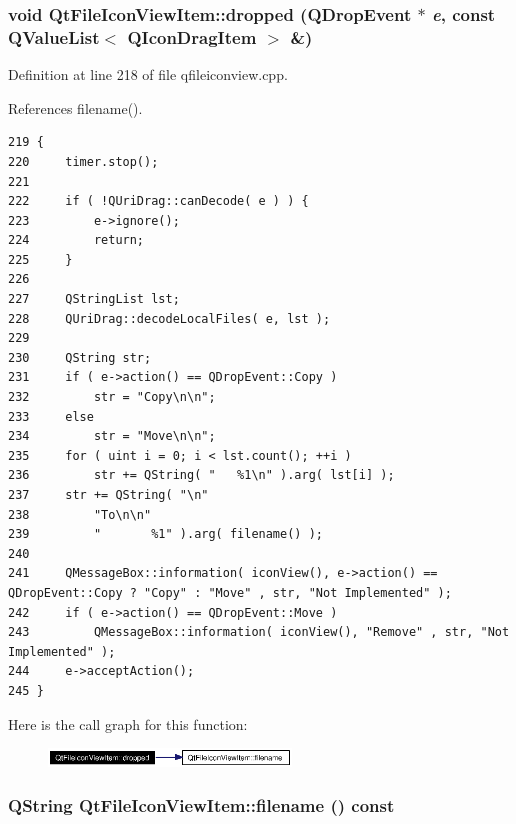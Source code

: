 \subsubsection{\setlength{\rightskip}{0pt plus 5cm}void Qt\-File\-Icon\-View\-Item::dropped (QDrop\-Event $\ast$ {\em e}, const QValue\-List$<$ QIcon\-Drag\-Item $>$ \&)\hspace{0.3cm}{\tt  [protected, virtual]}}\label{classQtFileIconViewItem_QtFileIconViewItemb0}




Definition at line 218 of file qfileiconview.cpp.

References filename().



\footnotesize\begin{verbatim}219 {
220     timer.stop();
221 
222     if ( !QUriDrag::canDecode( e ) ) {
223         e->ignore();
224         return;
225     }
226 
227     QStringList lst;
228     QUriDrag::decodeLocalFiles( e, lst );
229 
230     QString str;
231     if ( e->action() == QDropEvent::Copy )
232         str = "Copy\n\n";
233     else
234         str = "Move\n\n";
235     for ( uint i = 0; i < lst.count(); ++i )
236         str += QString( "   %1\n" ).arg( lst[i] );
237     str += QString( "\n"
238         "To\n\n"
239         "       %1" ).arg( filename() );
240 
241     QMessageBox::information( iconView(), e->action() == QDropEvent::Copy ? "Copy" : "Move" , str, "Not Implemented" );
242     if ( e->action() == QDropEvent::Move )
243         QMessageBox::information( iconView(), "Remove" , str, "Not Implemented" );
244     e->acceptAction();
245 }
\end{verbatim}\normalsize 


Here is the call graph for this function:\begin{figure}[H]
\begin{center}
\leavevmode
\includegraphics[width=183pt]{classQtFileIconViewItem_QtFileIconViewItemb0_cgraph}
\end{center}
\end{figure}
\subsubsection{\setlength{\rightskip}{0pt plus 5cm}QString Qt\-File\-Icon\-View\-Item::filename () const\hspace{0.3cm}{\tt  [inline]}}\label{classQtFileIconViewItem_QtFileIconViewItema3}




